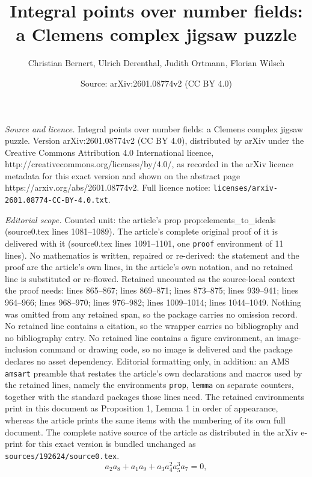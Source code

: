 \documentclass[10pt,a4paper]{amsart}
\title{Integral points over number fields: a Clemens complex jigsaw puzzle}
\author{Christian Bernert, Ulrich Derenthal, Judith Ortmann, Florian Wilsch}
\date{Source: arXiv:2601.08774v2 (CC BY 4.0)}
\begin{document}
\maketitle

\noindent\emph{Source and licence.} Integral points over number fields: a Clemens complex jigsaw puzzle. Version arXiv:2601.08774v2 (CC BY 4.0), distributed by arXiv under the Creative Commons Attribution 4.0 International licence, http://creativecommons.org/licenses/by/4.0/, as recorded in the arXiv licence metadata for this exact version and shown on the abstract page https://arxiv.org/abs/2601.08774v2. Full licence notice: \texttt{licenses/arxiv-2601.08774-CC-BY-4.0.txt}.\par\smallskip

\noindent\textit{Editorial scope.} Counted unit: the article's prop prop:elements\_to\_ideals (source0.tex lines 1081--1089). The article's complete original proof of it is delivered with it (source0.tex lines 1091--1101, one \texttt{proof} environment of 11 lines). No mathematics is written, repaired or re-derived: the statement and the proof are the article's own lines, in the article's own notation, and no retained line is substituted or re-flowed.  Retained uncounted as the source-local context the proof needs: lines 865--867; lines 869--871; lines 873--875; lines 939--941; lines 964--966; lines 968--970; lines 976--982; lines 1009--1014; lines 1044--1049.  Nothing was omitted from any retained span, so the package carries no omission record.  No retained line contains a citation, so the wrapper carries no bibliography and no bibliography entry.  No retained line contains a figure environment, an image-inclusion command or drawing code, so no image is delivered and the package declares no asset dependency.  Editorial formatting only, in addition: an AMS \texttt{amsart} preamble that restates the article's own declarations and macros used by the retained lines, namely the environments \texttt{prop}, \texttt{lemma} on separate counters, together with the standard packages those lines need.  The retained environments print in this document as Proposition 1, Lemma 1 in order of appearance, whereas the article prints the same items with the numbering of its own full document.  The complete native source of the article as distributed in the arXiv e-print for this exact version is bundled unchanged as \texttt{sources/192624/source0.tex}.
    \begin{equation}\label{eq:torsor}
            a_2a_8+a_1a_9+a_3a_4^2a_5^3a_7 = 0,
    \end{equation}
\end{document}
